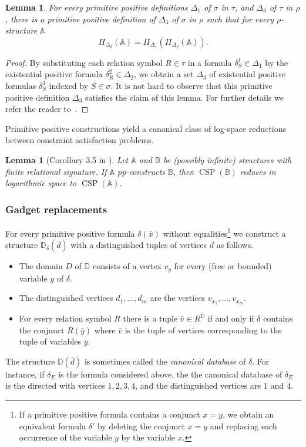 \documentclass{article}
\newtheorem{lemma}[theorem]{Lemma}
\theoremstyle{definition}
\theoremstyle{remark}
\DeclareMathOperator{\CSP}{CSP}
\newcommand{\bA}{{\mathbb A}}
\newcommand{\bB}{{\mathbb B}}
\newcommand{\bD}{{\mathbb D}}
\begin{document}
\begin{lemma}\label{lem:pp-def-compose}
    For every primitive positive definitions $\Delta_1$ of $\sigma$ in $\tau$, and
    $\Delta_3$ of $\tau$ in $\rho$, there is a primitive positive definition
    of $\Delta_3$ of $\sigma$ in $\rho$ such that for every $\rho$-structure $\bA$
    \[
    \Pi_{\Delta_3}(\bA) = \Pi_{\Delta_1}(\Pi_{\Delta_2}(\bA)).
    \]
\end{lemma}
\begin{proof}
    By substituting each relation symbol $R\in \tau$ in a formula $\delta^1_S\in\Delta_1$
    by the existential positive formula $\delta^2_R \in \Delta_2$, we obtain a set
    $\Delta_3$ of existential positive formulas $\delta^3_S$ indexed by $S\in \sigma$. It is
    not hard to observe that this primitive positive definition $\Delta_3$ satisfies
    the claim of this lemma. For further details we refer the reader to~\cite[Section 4.1.2]{Book}.
\end{proof}



Primitive positive constructions yield a canonical class of log-space reductions between
constraint satisfaction problems. 

\begin{lemma}[Corollary 3.5 in \cite{wonderland}]
\label{lem:pp-construction-reduction}
    Let $\bA$ and $\bB$ be (possibly infinite) structures with finite relational
    signature. If $\bA$ pp-constructs $\bB$, then $\CSP(\bB)$ reduces in logarithmic space
    to $\CSP(\bA)$. 
\end{lemma}

\subsubsection*{Gadget replacements}

For every primitive positive formula $\delta(\bar x)$ without equalities\footnote{If a 
primitive positive formula contains a conjunct $x = y$, we obtain an equivalent formula
$\delta'$ by deleting the conjunct $x = y$ and replacing each occurrence of the variable
$y$ by the variable $x$.} we construct a structure $\bD_\delta(\bar d)$
with a distinguished tuples of vertices $d$ as follows.
\begin{itemize}
    \item The domain $D$ of $\bD$ consists of a vertex $v_y$ for every (free or bounded) variable $y$ of $\delta$.
    \item The distinguished vertices $d_1,\dots, d_m$ are the vertices $v_{x_1},\dots, v_{x_m}$.
    \item For every relation symbol $R$ there is a tuple $\bar{v} \in R^{\bD}$ if and only if $\delta$
    contains the conjunct $R(\bar{y})$ where $\bar v$ is the tuple of vertices corresponding to the
    tuple of variables $\bar y$.
\end{itemize}
The structure $\bD(\bar d)$ is sometimes called the \emph{canonical database} of $\delta$. 
For instance, if $\delta_E$ is the formula considered above, the the canonical database of $\delta_E$
is the directed with vertices $1,2,3,4$, and the distinguished vertices are $1$ and $4$.
\end{document}
